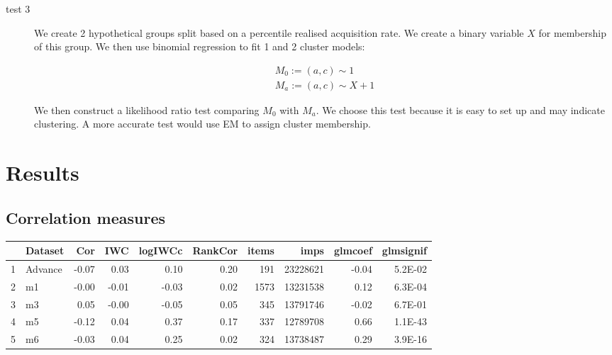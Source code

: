 \documentclass[11pt,a4,singlespacing,titlepagenumber=on]{scrreprt}
\numberwithin{equation}{chapter} %
\theoremstyle{remark}
\begin{document}
\begin{description}
	\item[test 3] We create 2 hypothetical groups split based on a percentile realised acquisition rate. We create a binary variable $X$ for membership of this group. We then use binomial regression to fit 1 and 2 cluster models:

\begin{align}
	M_0 := (a,c) \sim 1 \\
	M_a := (a,c) \sim X + 1
\end{align}

We then construct a likelihood ratio test comparing $M_0$ with $M_a$. We choose this test because it is easy to set up and may indicate clustering. A more accurate test would use EM to assign cluster membership.
%
%
%
%
%
\end{description}

\section{Results}
\subsection{Correlation measures}


\begin{table}[ht]
\centering
\begin{tabular}{rlrrrrrrrr}
  \hline
 & Dataset & Cor & IWC & logIWCc & RankCor & items & imps & glmcoef & glmsignif \\ 
  \hline
  1 & Advance & -0.07 & 0.03 & 0.10 & 0.20 & 191 & 23228621 & -0.04 & 5.2E-02 \\ 
  2 & m1 & -0.00 & -0.01 & -0.03 & 0.02 & 1573 & 13231538 & 0.12 & 6.3E-04 \\ 
  3 & m3 & 0.05 & -0.00 & -0.05 & 0.05 & 345 & 13791746 & -0.02 & 6.7E-01 \\ 
  4 & m5 & -0.12 & 0.04 & 0.37 & 0.17 & 337 & 12789708 & 0.66 & 1.1E-43 \\ 
  5 & m6 & -0.03 & 0.04 & 0.25 & 0.02 & 324 & 13738487 & 0.29 & 3.9E-16 \\ 
   \hline
\end{tabular}
\end{table}
\end{document}
